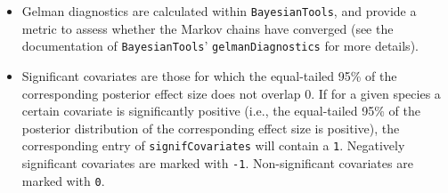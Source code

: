 \documentclass[
]{article}
\providecommand{\tightlist}{%
  \setlength{\itemsep}{0pt}\setlength{\parskip}{0pt}}
\begin{document}
\begin{itemize}
\tightlist
\item
  Gelman diagnostics are calculated within \texttt{BayesianTools}, and provide a metric to assess whether the Markov chains have converged (see the documentation of \texttt{BayesianTools}' \texttt{gelmanDiagnostics} for more details).
\item
  Significant covariates are those for which the equal-tailed 95\% of the corresponding posterior effect size does not overlap 0. If for a given species a certain covariate is significantly positive (i.e., the equal-tailed 95\% of the posterior distribution of the corresponding effect size is positive), the corresponding entry of \texttt{signifCovariates} will contain a \texttt{1}. Negatively significant covariates are marked with \texttt{-1}. Non-significant covariates are marked with \texttt{0}.
\end{itemize}
\end{document}
